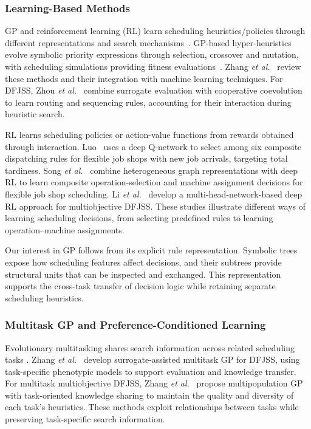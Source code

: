 \documentclass[10pt,journal]{IEEEtran}
\begin{document}
\subsubsection{Learning-Based Methods}
GP and reinforcement learning (RL) learn scheduling heuristics/policies through different representations and search mechanisms~\cite{xu2025learn}. GP-based hyper-heuristics evolve symbolic priority expressions through selection, crossover and mutation, with scheduling simulations providing fitness evaluations~\cite{koza1994genetic,guo2024improved}. Zhang \emph{et al.}~\cite{zhang2024survey} review these methods and their integration with machine learning techniques. For DFJSS, Zhou \emph{et al.}~\cite{zhou2020automatic} combine surrogate evaluation with cooperative coevolution to learn routing and sequencing rules, accounting for their interaction during heuristic search.

RL learns scheduling policies or action-value functions from rewards obtained through interaction. Luo~\cite{luo2020dynamic} uses a deep Q-network to select among six composite dispatching rules for flexible job shops with new job arrivals, targeting total tardiness. Song \emph{et al.}~\cite{song2023flexible} combine heterogeneous graph representations with deep RL to learn composite operation-selection and machine assignment decisions for flexible job shop scheduling. Li \emph{et al.}~\cite{li2025multi} develop a multi-head-network-based deep RL approach for multiobjective DFJSS. These studies illustrate different ways of learning scheduling decisions, from selecting predefined rules to learning operation--machine assignments.

Our interest in GP follows from its explicit rule representation. Symbolic trees expose how scheduling features affect decisions, and their subtrees provide structural units that can be inspected and exchanged. This representation supports the cross-task transfer of decision logic while retaining separate scheduling heuristics.

\subsubsection{Multitask GP and Preference-Conditioned Learning}
Evolutionary multitasking shares search information across related scheduling tasks \cite{gupta2015multifactorial}. Zhang \emph{et al.}~\cite{zhang2021surrogate} develop surrogate-assisted multitask GP for DFJSS, using task-specific phenotypic models to support evaluation and knowledge transfer. For multitask multiobjective DFJSS, Zhang \emph{et al.}~\cite{zhang2023multitask} propose multipopulation GP with task-oriented knowledge sharing to maintain the quality and diversity of each task's heuristics. These methods exploit relationships between tasks while preserving task-specific search information.
\end{document}
